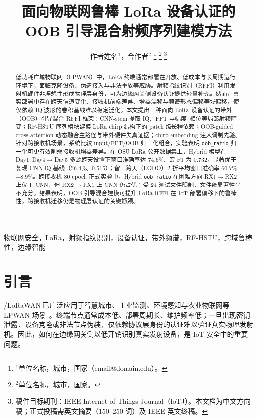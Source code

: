 \documentclass[journal]{IEEEtran}
\begin{document}
\title{面向物联网鲁棒 LoRa 设备认证的\\OOB 引导混合射频序列建模方法}

\author{作者姓名$^{1}$，合作者$^{2}$%
\thanks{$^{1}$单位名称，城市，国家（email@domain.edu）。}%
\thanks{$^{2}$单位名称，城市，国家。}%
\thanks{稿件目标期刊：IEEE Internet of Things Journal（IoTJ）。本文档为中文方向稿；正式投稿需英文摘要（150--250 词）及 IEEE 英文终稿。}}

\maketitle

\begin{abstract}
低功耗广域物联网（LPWAN）中，LoRa 终端通常部署在开放、低成本与长周期运行环境下，面临克隆设备、伪造接入与非法重放等威胁。射频指纹识别（RFFI）利用发射机硬件非理想性形成物理层身份，可为边缘网关侧设备认证提供轻量补充。然而，真实部署中存在跨天信道变化、接收机前端差异、增益漂移与频谱形态偏移等域偏移，使仅依赖 IQ 波形的卷积基线难以稳定泛化。本文提出一种面向 LoRa 设备认证的带外（OOB）引导混合 RFFI 框架：CNN-stem 提取 IQ、FFT 与幅度--相位等局部射频畸变；RF-HSTU 序列模块建模 LoRa chirp 结构下的 patch 级长程依赖；OOB-guided cross-attention 动态融合主路径与带外硬件失真证据；chirp embedding 注入调制先验。针对跨接收机场景，系统比较 input/FFT/OOB 归一化组合，实验表明 \texttt{oob\_ratio} 归一化可更有效削弱接收机增益差异。在 OSU LoRa 公开数据集上，Hybrid 模型在 Day1--Day4$\rightarrow$Day5 多源跨天设置下窗口准确率达 74.6\%、宏 F1 为 0.732，显著优于复现 CNN-IQ 基线（56.4\%、0.515）；留一跨天（LODO）五折平均窗口准确率 60.7\%$\pm$8.9\%。跨接收机 80 epoch 正式实验中，Hybrid \texttt{oob\_ratio} 在困难方向 RX1$\rightarrow$RX2 上优于 CNN，但 RX2$\rightarrow$RX1 上 CNN 仍占优；受 24 测试文件限制，文件级显著性尚不充分。结果表明，OOB 引导混合建模可提升 LoRa RFFI 在 IoT 部署偏移下的鲁棒性，跨接收机迁移仍是物理层认证的关键瓶颈。
\end{abstract}

\begin{IEEEkeywords}
物联网安全，LoRa，射频指纹识别，设备认证，带外频谱，RF-HSTU，跨域鲁棒性，边缘智能
\end{IEEEkeywords}

\section{引言}
/LoRaWAN 已广泛应用于智慧城市、工业监测、环境感知与农业物联网等 LPWAN 场景~\cite{lorawan_spec}。终端节点通常成本低、部署周期长、维护频率低；一旦出现密钥泄露、设备克隆或非法节点伪装，仅依赖协议层身份的认证难以验证真实物理发射机。因此，如何在边缘网关侧以低开销识别真实发射设备，是 IoT 安全中的重要问题。
\end{document}
